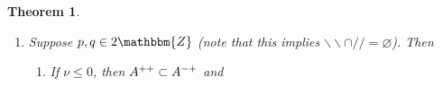 \documentclass[12pt]{msjproc} %
\newcommand{\tmop}[1]{\ensuremath{\operatorname{#1}}}
\newtheorem{theorem}{Theorem}
\theoremstyle{definition}
\theoremstyle{exampstyle} \newtheorem{examp}[theorem]{Theorem}
\begin{document}
\begin{versiona}
\begin{theorem}
\begin{enumerate}
\begin{enumerate}
      \
      
      \item If $\nu > p + q - 3$, then $A^{- -} \supset A^{- +}$ and
      
      \
      
      \begin{center}
        \begin{center}
          \begin{center}
            \begin{center}
              \begin{tabular}{|c|c|c|}
                \hline
                & $\nu \in 2\mathbbm{Z}$ & $\nu \in 2\mathbbm{Z}+ 1$\\
                \hline
                $(/ / \cup \backslash\backslash)^c$ & $A^{\noplus + -}$ &
                $\tmop{full}$\\
                \hline
                $\backslash\backslash - / /$ & $A^{+ -}$ & $A^{- +}$\\
                \hline
                $/ / -\backslash\backslash$ & $\varnothing$ & $\tmop{full}$\\
                \hline
              \end{tabular}
            \end{center}
          \end{center}
        \end{center}
      \end{center}
      
      \ 
    \end{enumerate}
    \item Suppose $p, q \in 2\mathbbm{Z}$ (note that this implies
    $\backslash\backslash \cap / / = \varnothing$). Then
    \begin{enumerate}
      \item If $\nu \leqslant 0$, then $A^{ + +} \subset A^{- +}$ and
      

\end{enumerate}
\end{enumerate}
\end{theorem}
\end{versiona}
\end{document}
